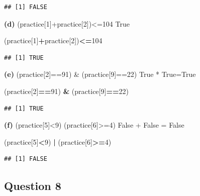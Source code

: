 \documentclass[
  openany]{book}
\newenvironment{Shaded}{\begin{snugshade}}{\end{snugshade}}
\newcommand{\DecValTok}[1]{\textcolor[rgb]{0.00,0.00,0.81}{#1}}
\newcommand{\NormalTok}[1]{#1}
\newcommand{\SpecialCharTok}[1]{\textcolor[rgb]{0.81,0.36,0.00}{\textbf{#1}}}
\begin{document}
\begin{verbatim}
## [1] FALSE
\end{verbatim}

\textbf{(d)} (practice{[}1{]}+practice{[}2{]})\textless=104 True

\begin{Shaded}
\begin{Highlighting}[]
\NormalTok{(practice[}\DecValTok{1}\NormalTok{]}\SpecialCharTok{+}\NormalTok{practice[}\DecValTok{2}\NormalTok{])}\SpecialCharTok{\textless{}=}\DecValTok{104}
\end{Highlighting}
\end{Shaded}

\begin{verbatim}
## [1] TRUE
\end{verbatim}

\textbf{(e)} (practice{[}2{]}==91) \& (practice{[}9{]}==22) True * True=True

\begin{Shaded}
\begin{Highlighting}[]
\NormalTok{(practice[}\DecValTok{2}\NormalTok{]}\SpecialCharTok{==}\DecValTok{91}\NormalTok{) }\SpecialCharTok{\&}\NormalTok{ (practice[}\DecValTok{9}\NormalTok{]}\SpecialCharTok{==}\DecValTok{22}\NormalTok{)}
\end{Highlighting}
\end{Shaded}

\begin{verbatim}
## [1] TRUE
\end{verbatim}

\textbf{(f)} (practice{[}5{]}\textless9) \textbar{} (practice{[}6{]}\textgreater=4) False + False = False

\begin{Shaded}
\begin{Highlighting}[]
\NormalTok{(practice[}\DecValTok{5}\NormalTok{]}\SpecialCharTok{\textless{}}\DecValTok{9}\NormalTok{) }\SpecialCharTok{|}\NormalTok{ (practice[}\DecValTok{6}\NormalTok{]}\SpecialCharTok{\textgreater{}=}\DecValTok{4}\NormalTok{)}
\end{Highlighting}
\end{Shaded}

\begin{verbatim}
## [1] FALSE
\end{verbatim}

\subsection{Question 8}\label{question-8}
\end{document}
